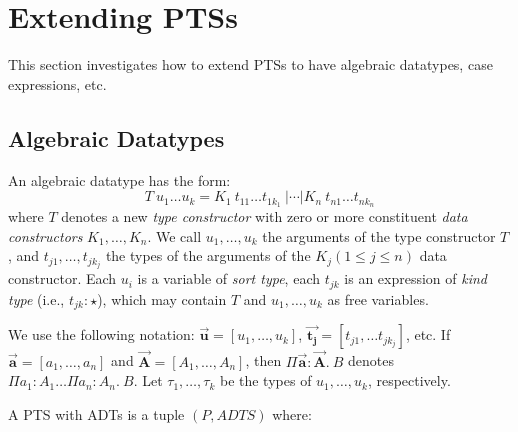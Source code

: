 \documentclass[oneside,a4paper]{article}
\numberwithin{equation}{section}
\begin{document}
\section{Extending PTSs }

This section investigates how to extend PTSs to have algebraic
datatypes, case expressions, etc.

\subsection{Algebraic Datatypes}

An algebraic datatype has the form:
\[
T \ u_{1} \dots u_{k} = K_{1} \ t_{11} \dots t_{1k_{1}} \ | \cdots |
K_{n} \ t_{n1} \dots t_{nk_{n}}
\]
where $T$ denotes a new \emph{type constructor} with zero or more
constituent \emph{data constructors} $K_{1}, \dots, K_{n}$. We call
$u_{1}, \dots, u_{k}$ the arguments of the type constructor $T$, and
$t_{j1}, \dots, t_{jk_{j}}$ the types of the arguments of the
$K_{j} (1 \leqslant j \leqslant n)$ data constructor. Each $u_{i}$ is
a variable of \emph{sort type}, each $t_{jk}$ is an expression of
\emph{kind type} (i.e., $t_{jk} : \star$), which may contain $T$ and
$u_{1}, \dots, u_{k}$ as free variables.

We use the following notation:
$\vec{\mathbf{u}} = [u_{1}, \dots, u_{k}]$,
$\vec{\mathbf{t_{j}}} = [t_{j1}, \dots t_{jk_{j}}]$, etc. If
$\vec{\mathbf{a}} = [a_{1}, \dots, a_{n}]$ and
$\vec{\mathbf{A}} = [A_{1}, \dots, A_{n}]$, then
$\Pi \vec{\mathbf{a}} : \vec{\mathbf{A}}.\ B$ denotes
$\Pi a_{1}:A_{1} \dots \Pi a_{n}:A_{n}.\ B$. Let
$\tau_{1},\dots,\tau_{k}$ be the types of $u_{1}, \dots, u_{k}$,
respectively.

A PTS with ADTs is a tuple $(P, ADTS)$ where:
\end{document}
